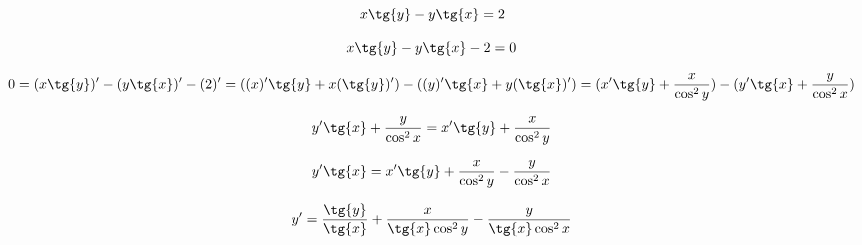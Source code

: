 {}

$$
x\tg{y}-y{\tg{x}} = 2
$$

$$
x\tg{y}-y{\tg{x}} - 2 = 0
$$

$$
 0 = (x\tg{y})'-(y{\tg{x}})' - (2)' = ( (x)'\tg{y} + x(\tg{y})' ) - ((y)'\tg{x} + y(\tg{x})') = (x'\tg{y} + \dfrac{x}{\cos^2{y}}) - (y'\tg{x}+\dfrac{y}{\cos^2{x}})
$$

$$
y'\tg{x}+\dfrac{y}{\cos^2{x}} = x'\tg{y} + \dfrac{x}{\cos^2{y}}
$$

$$
y'\tg{x}
  = x'\tg{y} + \dfrac{x}{\cos^2{y}} - \dfrac{y}{\cos^2{x}}
$$

$$
  y' = \dfrac{\tg{y}}{\tg{x}}   + \dfrac{x}{\tg{x}\cos^2{y}}   - \dfrac{y}{\tg{x}\cos^2{x}}
$$
